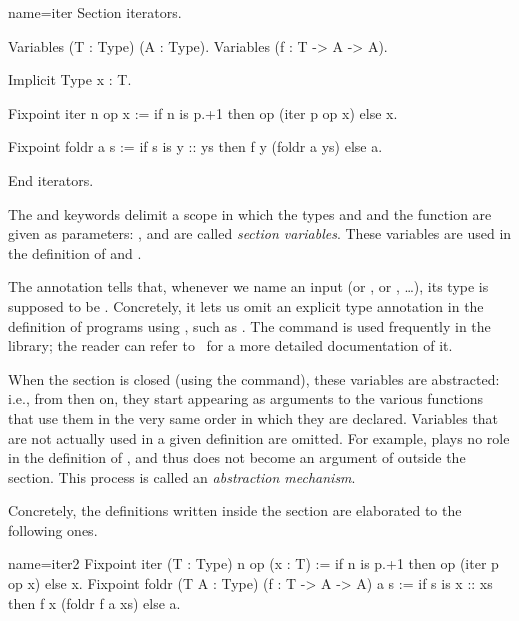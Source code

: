 \begin{coq}{name=iter}{}
Section iterators.

Variables (T : Type) (A : Type).
Variables (f : T -> A -> A).

Implicit Type x : T.

Fixpoint iter n op x :=
  if n is p.+1 then op (iter p op x) else x.

Fixpoint foldr a s :=
  if s is y :: ys then f y (foldr a ys) else a.

End iterators.
\end{coq}
The  and  keywords delimit a scope in which
the types  and  and the function  are given as
parameters: ,  and  are called \emph{section
  variables}.  These variables
are used in the definition of  and .

The  annotation
tells \Coq{} that, whenever we name
an input  (or , or , \ldots), its type is supposed to be
.  Concretely, it lets us omit an explicit type annotation
in the definition of programs using , such as .
The   command is used frequently in the
\mcbMC{} library; the reader can refer to~\cite[``Extensions of Gallina'']{Coq:manual}
for a more detailed documentation of it.

When
the section is closed (using the  command), these variables
are abstracted: i.e., from then on, they start appearing as arguments
to the various functions that use them in the very same
order in which they are declared.
Variables that are not actually used
in a given definition are omitted. For example,  plays no
role in the definition of , and thus does not become an
argument of  outside the section.
This process %
is called
an {\em abstraction mechanism}.

Concretely, the definitions written inside the section are
elaborated to the following ones.

\begin{coq}{name=iter2}{}
Fixpoint iter (T : Type) n op (x : T) :=
  if n is p.+1 then op (iter p op x) else x.
Fixpoint foldr (T A : Type) (f : T -> A -> A) a s :=
  if s is x :: xs then f x (foldr f a xs) else a.
\end{coq}

